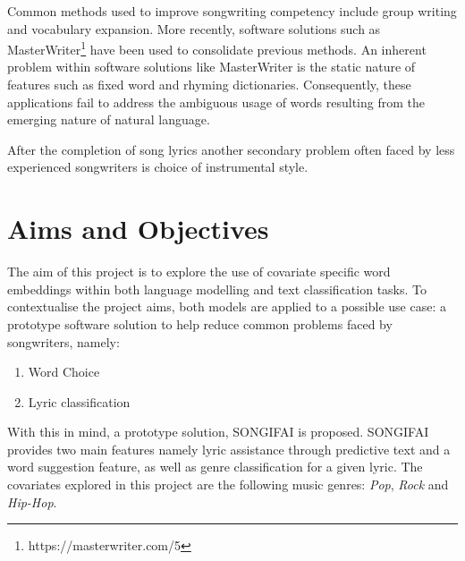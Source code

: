 \noindent
\newline
Common methods used to improve songwriting competency include group writing and vocabulary expansion. More recently, software solutions such as MasterWriter\footnote{https://masterwriter.com/5} have been used to consolidate previous methods. An inherent problem within software solutions like MasterWriter is the static nature of features such as fixed word and rhyming dictionaries. Consequently, these applications fail to address the ambiguous usage of words resulting from the emerging nature of natural language.

\noindent
\newline
After the completion of song lyrics another secondary problem often faced by less experienced songwriters is choice of instrumental style. 

\section{Aims and Objectives}
The aim of this project is to explore the use of covariate specific word embeddings within both  language modelling and text classification tasks. To contextualise the project aims, both models are applied to a possible use case: a prototype software solution to help reduce common problems faced by songwriters, namely:

\begin{enumerate}
	\item Word Choice 
	\item Lyric classification
\end{enumerate}

\noindent
\newline
With this in mind, a prototype solution, SONGIFAI is proposed. SONGIFAI provides two main features namely lyric assistance through predictive text and a word suggestion feature, as well as genre classification for a given lyric. The covariates explored in this project are the following music genres: \textit{Pop}, \textit{Rock} and \textit{Hip-Hop}. 

